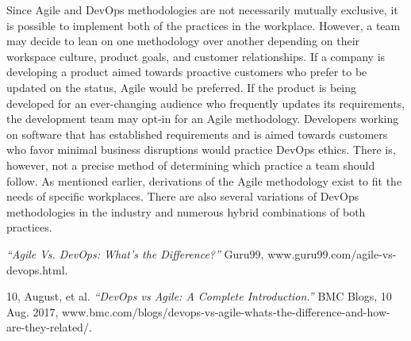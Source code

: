 \documentclass[12pt]{article}
\begin{document}
  Since Agile and DevOps methodologies are not necessarily mutually exclusive, it is possible to implement both of the practices in the workplace. However, a team may decide to lean on one methodology over another depending on their workspace culture, product goals, and customer relationships.\cite{BMC} If a company is developing a product aimed towards proactive customers who prefer to be updated on the status, Agile would be preferred. If the product is being developed for an ever-changing audience who frequently updates its requirements, the development team may opt-in for an Agile methodology. Developers working on software that has established requirements and is aimed towards customers who favor minimal business disruptions would practice DevOps ethics. There is, however, not a precise method of determining which practice a team should follow. As mentioned earlier, derivations of the Agile methodology exist to fit the needs of specific workplaces. There are also several variations of DevOps methodologies in the industry and numerous hybrid combinations of both practices.

  \begin{thebibliography}{2}
  \textit{“Agile Vs. DevOps: What's the Difference?”} Guru99, www.guru99.com/agile-vs-devops.html.

  10, August, et al. \textit{“DevOps vs Agile: A Complete Introduction.”} BMC Blogs, 10 Aug. 2017, www.bmc.com/blogs/devops-vs-agile-whats-the-difference-and-how-are-they-related/. 

  \end{thebibliography}
\end{document}
